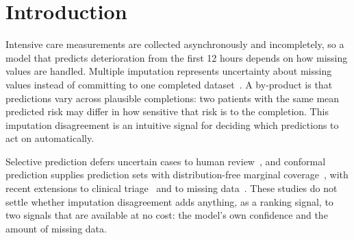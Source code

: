 \documentclass[conference]{IEEEtran}
\begin{document}
\section{Introduction}

Intensive care measurements are collected asynchronously and incompletely, so a model that predicts deterioration from the first 12 hours depends on how missing values are handled. Multiple imputation represents uncertainty about missing values instead of committing to one completed dataset~\cite{rubin1987multiple,vanbuuren2011mice}. A by-product is that predictions vary across plausible completions: two patients with the same mean predicted risk may differ in how sensitive that risk is to the completion. This imputation disagreement is an intuitive signal for deciding which predictions to act on automatically.

Selective prediction defers uncertain cases to human review~\cite{chow1970optimum,geifman2017selective,mozannar2020consistent}, and conformal prediction supplies prediction sets with distribution-free marginal coverage~\cite{angelopoulos2023conformal}, with recent extensions to clinical triage~\cite{kwon2026conformal} and to missing data~\cite{zaffran2023conformal,he2026safeimpute,wong2026mc2}. These studies do not settle whether imputation disagreement adds anything, as a ranking signal, to two signals that are available at no cost: the model's own confidence and the amount of missing data.
\end{document}
